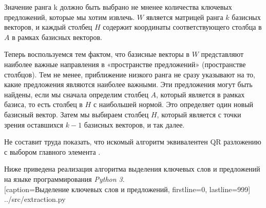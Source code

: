 Значение ранга k должно быть выбрано не мненее количества ключевых предложений, которые мы хотим извлечь.
$W$ является матрицей ранга $k$ базисных векторов,
и каждый столбец $H$ содержит координаты соответствующего столбца в $A$ в рамках базисных векторов.

Теперь воспользуемся тем фактом, что базисные векторы в $W$ представляют наиболее важные направления в «пространстве предложений» (пространстве столбцов).
Тем не менее, приближение низкого ранга не сразу указывают на то, какие предложения являются наиболее важными.
Эти предложения могут быть найдены, если мы сначала определим столбец $A$, который является  в рамках базиса,
то есть столбец в $H$ с наибольшей нормой. Это определяет один новый базисный вектор.
Затем мы выбираем столбец $H$, который является  с точки зрения оставшихся $k-1$ базисных векторов, и так далее.

Не составит труда показать, что искомый алгоритм эквивалентен QR разложению с выбором главного элемента \cite{blas}.

\newpage

Ниже приведена реализация алгоритма выделения ключевых слов и предложений на языке программирования \textit{Python 3}.
\\


  [caption=Выделение ключевых слов и предложений, firstline=0, lastline=999]
  {../src/extraction.py}
